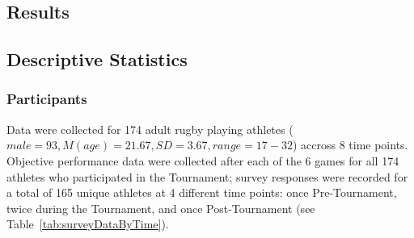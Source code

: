 \begin{CJK}{UTF8}{gbsn}































\clearpage

\section{Results}


\subsection{Descriptive Statistics}

  \subsubsection{Participants}

Data were collected for 174 adult rugby playing athletes ($male = 93, M(age) = 21.67, SD = 3.67, range = 17-32$) accross 8 time points. Objective performance data were collected after each of the 6 games for all 174 athletes who participated in the Tournament; survey responses were recorded for a total of 165 unique athletes at 4 different time points: once Pre-Tournament, twice during the Tournament, and once Post-Tournament (see Table~\ref{tab:surveyDataByTime}).






\end{CJK}
